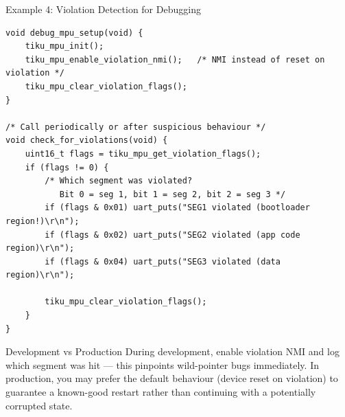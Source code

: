 \documentclass[aspectratio=169, 10pt]{beamer}
\begin{document}
\begin{frame}[fragile]{Example 4: Violation Detection for Debugging}
\begin{lstlisting}[style=cstyle]
void debug_mpu_setup(void) {
    tiku_mpu_init();
    tiku_mpu_enable_violation_nmi();   /* NMI instead of reset on violation */
    tiku_mpu_clear_violation_flags();
}

/* Call periodically or after suspicious behaviour */
void check_for_violations(void) {
    uint16_t flags = tiku_mpu_get_violation_flags();
    if (flags != 0) {
        /* Which segment was violated?
           Bit 0 = seg 1, bit 1 = seg 2, bit 2 = seg 3 */
        if (flags & 0x01) uart_puts("SEG1 violated (bootloader region!)\r\n");
        if (flags & 0x02) uart_puts("SEG2 violated (app code region)\r\n");
        if (flags & 0x04) uart_puts("SEG3 violated (data region)\r\n");

        tiku_mpu_clear_violation_flags();
    }
}
\end{lstlisting}

\vspace{0.3em}
\begin{alertblock}{Development vs Production}
During development, enable violation NMI and log which segment was hit ---
this pinpoints wild-pointer bugs immediately. In production, you may
prefer the default behaviour (device reset on violation) to guarantee
a known-good restart rather than continuing with a potentially
corrupted state.
\end{alertblock}
\end{frame}
\end{document}
